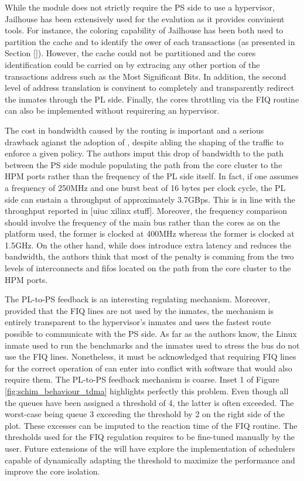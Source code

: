 While the \schim module does not strictly require the PS side to use a hypervisor,
Jailhouse has been extensively used for the evalution as it provides convinient tools.
For instance, the coloring capability of Jailhouse has been both used to partition
the cache and to identify the ower of each transactions (as presented in Section \ref{}).
However, the cache could not be partitioned and the cores identification could be
carried on by extracing any other portion of the transactions address such as the
Most Significant Bits. In addition, the second level of address translation is
convinent to completely and transparently redirect the inmates through the PL side.
Finally, the cores throttling via the FIQ routine can also be implemented without
requirering an hypervisor.

The cost in bandwidth caused by the routing is important and a serious drawback
agianst the adoption of \schim, despite abling the shaping of the traffic to
enforce a given policy.
The authors imput this drop of bandwidth to the path between the PS side module
populating the path from the core cluster to the HPM ports rather than the
frequency of the PL side itself. In fact, if one assumes a frequency of 250MHz
and one burst beat of 16 bytes per clock cycle, the PL side can sustain a
throughput of approximately 3.7GBps. This is in line with the throughput reported
in [uiuc xilinx stuff]. Moreover, the frequency comparison should involve the
frequency of the main bus rather than the cores as on the platform used, the former
is clocked at 400MHz whereas the former is clocked at 1.5GHz. On the other hand,
while \schim does introduce extra latency and reduces the bandwidth, the authors
think that most of the penalty is comming from the two levels of interconnects
and fifos located on the path from the core cluster to the HPM ports.

The PL-to-PS feedback is an interesting regulating mechanism. Moreover, provided
that the FIQ lines are not used by the inmates, the mechanism is entirely transparent
to the hypervisor's inmates and uses the fastest route possible to communicate
with the PS side. As far as the authors know, the Linux inmate used to run the
benchmarks and the inmates used to stress the bus do not use the FIQ lines.
Nonetheless, it must be acknowledged that requiring FIQ lines for the correct
operation of \schim can enter into conflict with software that would also
require them.
The PL-to-PS feedback mechanism is coarse. Inset 1 of Figure
\ref{fig:schim_behaviour_tdma} highlights perfectly this problem. Even though all
the queues have been assigned a threshold of 4, the latter is often exceeded.
The worst-case being queue 3 exceeding the threshold by 2 on the right side of the
plot. These excesses can be imputed to the reaction time of the FIQ routine. The
thresholds used for the FIQ regulation requires to be fine-tuned manually by the
user. Future extensions of the \schim will have explore the implementation of
schedulers capable of dynamically adapting the threshold to maximize the performance
and improve the core isolation.
\color{black}
